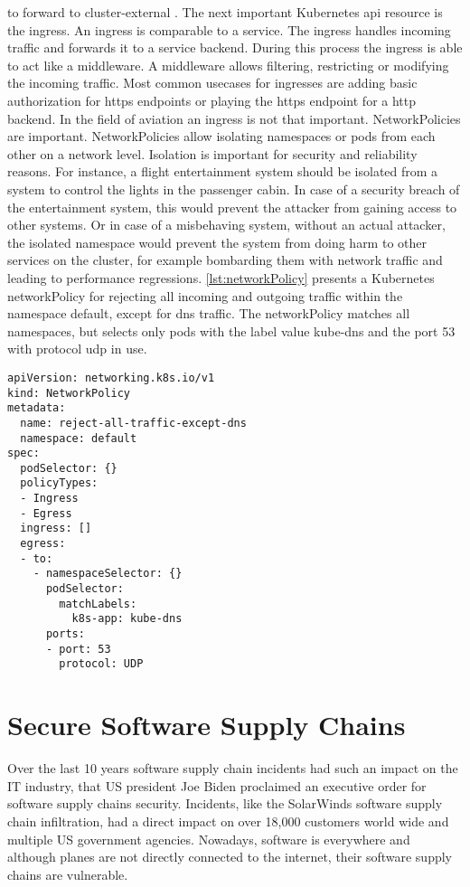 \documentclass[titlepage]{report}
\begin{document}
to forward to cluster-external . The next important Kubernetes \gls{api} resource is the ingress. An ingress is comparable to a service. The ingress handles incoming
traffic and forwards it to a service backend. During this process the ingress is able to act like a middleware. A middleware allows filtering, restricting or modifying the incoming traffic.
Most common usecases for ingresses are adding basic authorization for \gls{https} endpoints or playing the \gls{https} endpoint for a \gls{http} backend. In the field of aviation an ingress
is not that important.  NetworkPolicies are important. NetworkPolicies allow isolating namespaces or pods from each other on a network level. Isolation is important for security
and reliability reasons. For instance, a flight entertainment system should be isolated from a system to control the lights in the passenger cabin. In case of a security breach
of the entertainment system, this would prevent the attacker from gaining access to other systems. Or in case of a misbehaving system, without an actual attacker, the isolated namespace
would prevent the system from doing harm to other services on the cluster, for example bombarding them with network traffic and leading to performance regressions. \autoref{lst:networkPolicy}
presents a Kubernetes networkPolicy for rejecting all incoming and outgoing traffic within the namespace default, except for \gls{dns} traffic. The networkPolicy matches
all namespaces, but selects only pods with the label value kube-dns and the port 53 with protocol \gls{udp} in use.
\begin{minipage}{\linewidth}
\begin{lstlisting}[caption={Example networkPolicy that rejects all traffic in a namespace except for DNS requests},label={lst:networkPolicy}]
apiVersion: networking.k8s.io/v1
kind: NetworkPolicy
metadata:
  name: reject-all-traffic-except-dns
  namespace: default
spec:
  podSelector: {}
  policyTypes:
  - Ingress
  - Egress
  ingress: []
  egress:
  - to:
    - namespaceSelector: {}
      podSelector:
        matchLabels:
          k8s-app: kube-dns
      ports:
      - port: 53
        protocol: UDP
\end{lstlisting}
\end{minipage}
\section{Secure Software Supply Chains}
Over the last 10 years software supply chain incidents had such an impact on the IT industry, that US president Joe Biden proclaimed an executive order for
software supply chains security\cite{ExecutiveOrder}. Incidents, like the SolarWinds software supply chain infiltration, had a direct impact on over 18,000 customers world wide
and multiple US government agencies. Nowadays, software is everywhere and although planes are not directly connected to the internet, their software supply chains are vulnerable.
\end{document}
